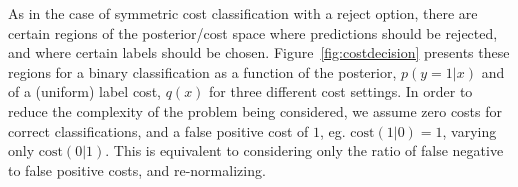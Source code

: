 As in the case of symmetric cost classification with a reject option, there are certain regions of the posterior/cost space where predictions should be rejected, and where certain labels should be chosen. Figure~\ref{fig:costdecision} presents these regions for a binary classification as a function of the posterior, $p(y=1|x)$ and of a (uniform) label cost, $q(x)$ for three different cost settings. In order to reduce the complexity of the problem being considered, we assume zero costs for correct classifications, and a false positive cost of $1$, eg. $\mbox{cost}(1|0)=1$, varying only $\mbox{cost}(0|1)$. This is equivalent to considering only the ratio of false negative to false positive costs, and re-normalizing.

